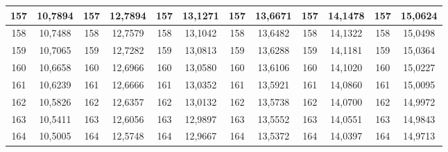 \documentclass[a4paper,12pt]{article} %
\begin{document}
\begin{longtable}[c]{cccccccccc|c|c|}
	\multicolumn{1}{|c|}{157} & \multicolumn{1}{c|}{10,7894} & \multicolumn{1}{c|}{157} & \multicolumn{1}{c|}{12,7894} & \multicolumn{1}{c|}{157} & \multicolumn{1}{c|}{13,1271} & \multicolumn{1}{c|}{157} & \multicolumn{1}{c|}{13,6671} & \multicolumn{1}{c|}{157} & 14,1478 & 157 & 15,0624 \\ \hline
	\multicolumn{1}{|c|}{158} & \multicolumn{1}{c|}{10,7488} & \multicolumn{1}{c|}{158} & \multicolumn{1}{c|}{12,7579} & \multicolumn{1}{c|}{158} & \multicolumn{1}{c|}{13,1042} & \multicolumn{1}{c|}{158} & \multicolumn{1}{c|}{13,6482} & \multicolumn{1}{c|}{158} & 14,1322 & 158 & 15,0498 \\ \hline
	\multicolumn{1}{|c|}{159} & \multicolumn{1}{c|}{10,7065} & \multicolumn{1}{c|}{159} & \multicolumn{1}{c|}{12,7282} & \multicolumn{1}{c|}{159} & \multicolumn{1}{c|}{13,0813} & \multicolumn{1}{c|}{159} & \multicolumn{1}{c|}{13,6288} & \multicolumn{1}{c|}{159} & 14,1181 & 159 & 15,0364 \\ \hline
	\multicolumn{1}{|c|}{160} & \multicolumn{1}{c|}{10,6658} & \multicolumn{1}{c|}{160} & \multicolumn{1}{c|}{12,6966} & \multicolumn{1}{c|}{160} & \multicolumn{1}{c|}{13,0580} & \multicolumn{1}{c|}{160} & \multicolumn{1}{c|}{13,6106} & \multicolumn{1}{c|}{160} & 14,1020 & 160 & 15,0227 \\ \hline
	\multicolumn{1}{|c|}{161} & \multicolumn{1}{c|}{10,6239} & \multicolumn{1}{c|}{161} & \multicolumn{1}{c|}{12,6666} & \multicolumn{1}{c|}{161} & \multicolumn{1}{c|}{13,0352} & \multicolumn{1}{c|}{161} & \multicolumn{1}{c|}{13,5921} & \multicolumn{1}{c|}{161} & 14,0860 & 161 & 15,0095 \\ \hline
	\multicolumn{1}{|c|}{162} & \multicolumn{1}{c|}{10,5826} & \multicolumn{1}{c|}{162} & \multicolumn{1}{c|}{12,6357} & \multicolumn{1}{c|}{162} & \multicolumn{1}{c|}{13,0132} & \multicolumn{1}{c|}{162} & \multicolumn{1}{c|}{13,5738} & \multicolumn{1}{c|}{162} & 14,0700 & 162 & 14,9972 \\ \hline
	\multicolumn{1}{|c|}{163} & \multicolumn{1}{c|}{10,5411} & \multicolumn{1}{c|}{163} & \multicolumn{1}{c|}{12,6056} & \multicolumn{1}{c|}{163} & \multicolumn{1}{c|}{12,9897} & \multicolumn{1}{c|}{163} & \multicolumn{1}{c|}{13,5552} & \multicolumn{1}{c|}{163} & 14,0551 & 163 & 14,9843 \\ \hline
	\multicolumn{1}{|c|}{164} & \multicolumn{1}{c|}{10,5005} & \multicolumn{1}{c|}{164} & \multicolumn{1}{c|}{12,5748} & \multicolumn{1}{c|}{164} & \multicolumn{1}{c|}{12,9667} & \multicolumn{1}{c|}{164} & \multicolumn{1}{c|}{13,5372} & \multicolumn{1}{c|}{164} & 14,0397 & 164 & 14,9713 \\ \hline

\end{longtable}
\end{document}

